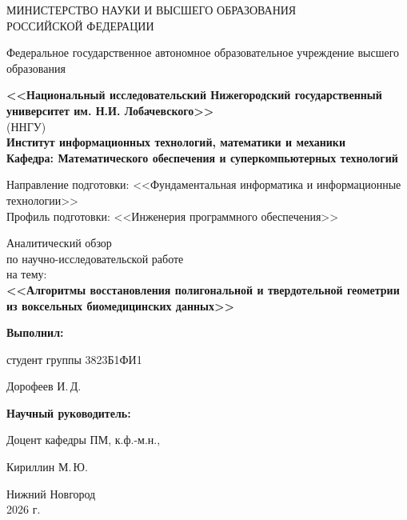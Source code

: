 \begin{titlepage}
	\begin{center}
		\large
		{МИНИСТЕРСТВО НАУКИ И ВЫСШЕГО ОБРАЗОВАНИЯ\\ РОССИЙСКОЙ ФЕДЕРАЦИИ}

		Федеральное государственное автономное образовательное учреждение высшего образования
		\vspace{0.5cm}

		\textbf{<<Национальный исследовательский Нижегородский государственный университет им. Н.И. Лобачевского>>}\\
		(ННГУ)\\
		\vspace{1cm}
		\textbf{Институт информационных технологий, математики и механики}\\
		\vspace{0.5cm}
		\textbf{Кафедра: Ма­те­ма­ти­че­ско­го обес­пе­че­ния и су­пер­ком­пью­тер­ных тех­но­ло­гий}
		\vspace{1cm}

		Направление подготовки: <<Фундаментальная информатика и информационные технологии>>\\
		Профиль подготовки: <<Инженерия программного обеспечения>>
		\vfill

		\vfill

		\Large
		Аналитический обзор \\
		\normalsize
        по научно-исследовательской работе \\
		на тему:\\
		\Large
		\textbf{<<Алгоритмы восстановления полигональной и твердотельной геометрии из воксельных биомедицинских данных>>}
		{\LARGE
		}
		\bigskip


	\end{center}
	\vfill

	\hfill\begin{minipage}{0.4\textwidth}
		\textbf{Выполнил:}

            студент группы 3823Б1ФИ1

            \underline{\hspace{3cm}} Дорофеев И.\,Д. \bigskip

	\end{minipage}%

	\hfill\begin{minipage}{0.4\textwidth}
		\textbf{Научный руководитель:}

		Доцент кафедры ПМ, к.ф.-м.н.,

		\underline{\hspace{3cm}}  Кириллин М.\,Ю.

	\end{minipage}
	\vfill

	\begin{center}
		Нижний Новгород\\
		2026 г.
	\end{center}
\end{titlepage}
\thispagestyle{empty} %
